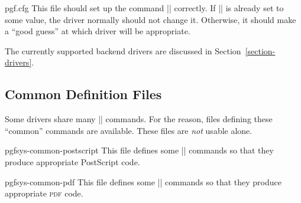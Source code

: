 \begin{filedescription}{pgf.cfg}
  This file should set up the command |\pgfsysdriver| correctly. If
  |\pgfsysdriver| is already set to some value, the driver normally
  should not change it. Otherwise, it should make a ``good guess'' at
  which driver will be appropriate.
\end{filedescription}


The currently supported backend drivers are discussed in
Section~\ref{section-drivers}. 


\subsection{Common Definition Files}

Some drivers share many |\pgfsys@| commands. For the reason, files
defining these ``common'' commands are available. These files are
\emph{not} usable alone.

\begin{filedescription}{pgfsys-common-postscript}
  This file defines some |\pgfsys@| commands so that they produce
  appropriate PostScript code.
\end{filedescription}

\begin{filedescription}{pgfsys-common-pdf}
  This file defines some |\pgfsys@| commands so that they produce
  appropriate \textsc{pdf} code.
\end{filedescription}


